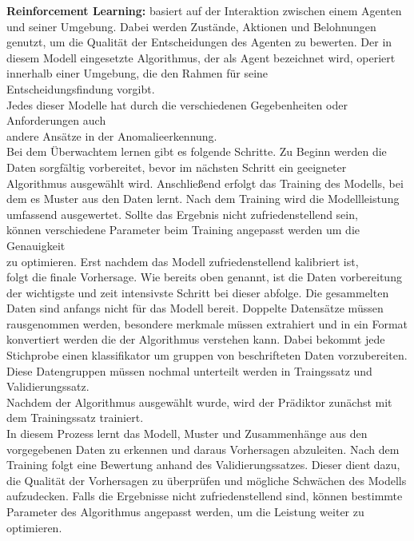\nAbsatz
\textbf{Reinforcement Learning:} basiert auf der Interaktion zwischen einem Agenten und seiner Umgebung. Dabei werden Zustände, Aktionen und Belohnungen genutzt, um die Qualität der Entscheidungen des Agenten zu bewerten. Der in diesem Modell eingesetzte Algorithmus, der als Agent bezeichnet wird, operiert innerhalb einer Umgebung, die den Rahmen für seine  \\Entscheidungsfindung vorgibt\cite{Lernen}.
\\
Jedes dieser Modelle hat durch die verschiedenen Gegebenheiten oder Anforderungen auch \\ andere Ansätze in der Anomalieerkennung. 
\\
Bei dem Überwachtem lernen gibt es folgende Schritte. Zu Beginn werden die Daten sorgfältig vorbereitet, bevor im nächsten Schritt ein geeigneter Algorithmus ausgewählt wird. Anschließend erfolgt das Training des Modells, bei dem es Muster aus den Daten lernt. Nach dem Training wird die Modellleistung umfassend ausgewertet. Sollte das Ergebnis nicht zufriedenstellend sein, \\ können verschiedene Parameter beim Training angepasst werden um die Genauigkeit \\ zu optimieren. Erst nachdem das Modell zufriedenstellend kalibriert ist,\\ folgt die finale Vorhersage. Wie bereits oben genannt, ist die Daten vorbereitung der wichtigste und zeit intensivste Schritt bei dieser abfolge. Die gesammelten Daten sind anfangs nicht für das Modell bereit\cite{Lernen}\cite{Preprocessing}\cite{OnlyPreprocessing}. 
\nAbsatz
Doppelte Datensätze müssen rausgenommen werden, besondere merkmale müssen extrahiert und in ein Format konvertiert werden die der Algorithmus verstehen kann. Dabei bekommt jede Stichprobe einen klassifikator um gruppen von beschrifteten Daten vorzubereiten. \\ Diese Datengruppen müssen nochmal unterteilt werden in Traingssatz und Validierungssatz. \\ Nachdem der Algorithmus ausgewählt wurde, wird der Prädiktor zunächst mit dem Trainingssatz trainiert\cite{Preprocessing}\cite{OnlyPreprocessing}.
\\
In diesem Prozess lernt das Modell, Muster und Zusammenhänge aus den vorgegebenen Daten zu erkennen und daraus Vorhersagen abzuleiten.
Nach dem Training folgt eine Bewertung anhand des Validierungssatzes. Dieser dient dazu, die Qualität der Vorhersagen zu überprüfen und mögliche Schwächen des Modells aufzudecken. Falls die Ergebnisse nicht zufriedenstellend sind, können bestimmte Parameter des Algorithmus angepasst werden, um die Leistung weiter zu optimieren.
